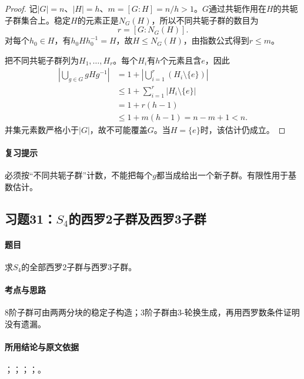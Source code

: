 
\begin{proof}
记$|G|=n$、$|H|=h$、$m=[G:H]=n/h>1$。$G$通过共轭作用在$H$的共轭子群集合上。稳定$H$的元素正是$N_G(H)$，所以不同共轭子群的数目为
\[
r=[G:N_G(H)].
\]
对每个$h_0\in H$，有$h_0Hh_0^{-1}=H$，故$H\le N_G(H)$，由指数公式得到$r\le m$。

把不同共轭子群列为$H_1,\ldots,H_r$。每个$H_i$有$h$个元素且含$e$，因此
\begin{align*}
\left|\bigcup_{g\in G}gHg^{-1}\right|
&=1+\left|\bigcup_{i=1}^r(H_i\setminus\{e\})\right|\\
&\le1+\sum_{i=1}^r|H_i\setminus\{e\}|\\
&=1+r(h-1)\\
&\le1+m(h-1)=n-m+1<n.
\end{align*}
并集元素数严格小于$|G|$，故不可能覆盖$G$。当$H=\{e\}$时，该估计仍成立。
\end{proof}

\paragraph{复习提示}
必须按“不同共轭子群”计数，不能把每个$g$都当成给出一个新子群。有限性用于基数估计。


\subsection{习题31：\texorpdfstring{$S_4$的西罗2子群及西罗3子群}{S4的西罗2子群及西罗3子群}}
\label{ex:2:31}

\paragraph{题目}
求$S_4$的全部西罗2子群与西罗3子群。

\paragraph{考点与思路}
8阶子群可由两两分块的稳定子构造；3阶子群由3-轮换生成，再用西罗数条件证明没有遗漏。

\paragraph{所用结论与原文依据}
；；；；。


